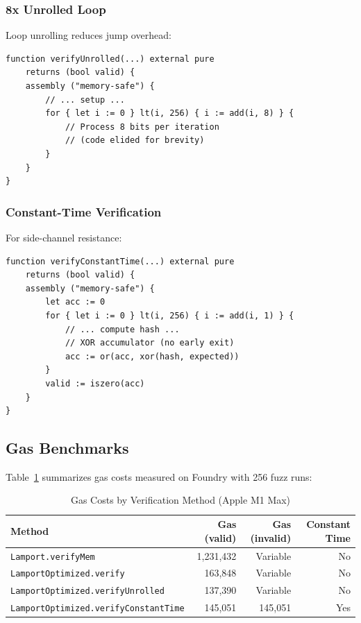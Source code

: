 \documentclass[11pt,a4paper]{article}
\begin{document}
\subsubsection{8x Unrolled Loop}

Loop unrolling reduces jump overhead:

\begin{lstlisting}[language=Solidity]
function verifyUnrolled(...) external pure
    returns (bool valid) {
    assembly ("memory-safe") {
        // ... setup ...
        for { let i := 0 } lt(i, 256) { i := add(i, 8) } {
            // Process 8 bits per iteration
            // (code elided for brevity)
        }
    }
}
\end{lstlisting}

\subsubsection{Constant-Time Verification}

For side-channel resistance:

\begin{lstlisting}[language=Solidity]
function verifyConstantTime(...) external pure
    returns (bool valid) {
    assembly ("memory-safe") {
        let acc := 0
        for { let i := 0 } lt(i, 256) { i := add(i, 1) } {
            // ... compute hash ...
            // XOR accumulator (no early exit)
            acc := or(acc, xor(hash, expected))
        }
        valid := iszero(acc)
    }
}
\end{lstlisting}

\subsection{Gas Benchmarks}

Table~\ref{tab:gas} summarizes gas costs measured on Foundry with 256 fuzz runs:

\begin{table}[h]
\centering
\caption{Gas Costs by Verification Method (Apple M1 Max)}
\label{tab:gas}
\begin{tabular}{@{}lrrr@{}}
\toprule
Method & Gas (valid) & Gas (invalid) & Constant Time \\
\midrule
\texttt{Lamport.verifyMem} & 1,231,432 & Variable & No \\
\texttt{LamportOptimized.verify} & 163,848 & Variable & No \\
\texttt{LamportOptimized.verifyUnrolled} & 137,390 & Variable & No \\
\texttt{LamportOptimized.verifyConstantTime} & 145,051 & 145,051 & Yes \\
\bottomrule
\end{tabular}
\end{table}
\end{document}
